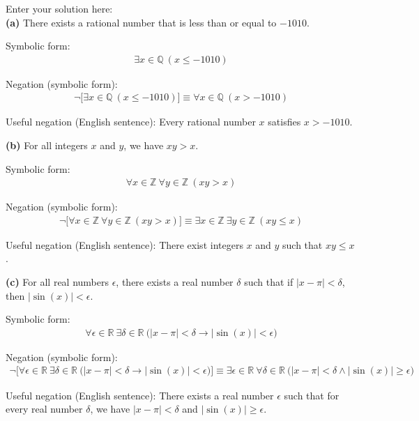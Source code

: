 \documentclass[10pt]{exam}
\begin{document}
\begin{questions}
\begin{solution}
Enter your solution here:\\

\textbf{(a)} There exists a rational number that is less than or equal to $-1010$.

Symbolic form:
\begin{align*}
\exists x \in \mathbb{Q} \ (x \leq -1010)
\end{align*}

Negation (symbolic form):
\begin{align*}
\lnot \bigl[\exists x \in \mathbb{Q} \ (x \leq -1010)\bigr] \equiv \forall x \in \mathbb{Q} \ (x > -1010)
\end{align*}

Useful negation (English sentence): Every rational number $x$ satisfies $x > -1010$.

\vspace{.2cm}
\textbf{(b)} For all integers $x$ and $y$, we have $xy > x$.

Symbolic form:
\begin{align*}
\forall x \in \mathbb{Z} \ \forall y \in \mathbb{Z} \ (xy > x)
\end{align*}

Negation (symbolic form):
\begin{align*}
\lnot \bigl[\forall x \in \mathbb{Z} \ \forall y \in \mathbb{Z} \ (xy > x)\bigr] \equiv \exists x \in \mathbb{Z} \ \exists y \in \mathbb{Z} \ (xy \leq x)
\end{align*}

Useful negation (English sentence): There exist integers $x$ and $y$ such that $xy \leq x$.

\vspace{.2cm}
\textbf{(c)} For all real numbers $\epsilon$, there exists a real number $\delta$ such that if $|x - \pi| < \delta$, then $|\sin(x)| < \epsilon$.

Symbolic form:
\begin{align*}
\forall \epsilon \in \mathbb{R} \ \exists \delta \in \mathbb{R} \ \bigl(|x - \pi| < \delta \rightarrow |\sin(x)| < \epsilon\bigr)
\end{align*}

Negation (symbolic form):
\begin{align*}
\lnot \bigl[\forall \epsilon \in \mathbb{R} \ \exists \delta \in \mathbb{R} \ \bigl(|x - \pi| < \delta \rightarrow |\sin(x)| < \epsilon\bigr)\bigr]
\equiv \exists \epsilon \in \mathbb{R} \ \forall \delta \in \mathbb{R} \ \bigl(|x - \pi| < \delta \land |\sin(x)| \geq \epsilon\bigr)
\end{align*}

Useful negation (English sentence): There exists a real number $\epsilon$ such that for every real number $\delta$, we have $|x - \pi| < \delta$ and $|\sin(x)| \geq \epsilon$.

\end{solution}

\end{questions}
\end{document}
